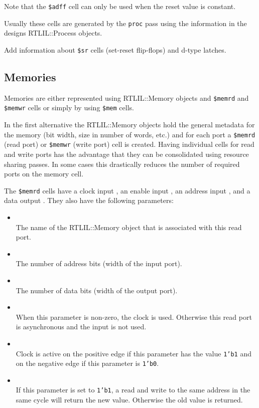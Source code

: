 Note that the {\tt \$adff} cell can only be used when the reset value is constant.

\begin{sloppypar}
Usually these cells are generated by the {\tt proc} pass using the information
in the designs RTLIL::Process objects.
\end{sloppypar}

\begin{fixme}
Add information about {\tt \$sr} cells (set-reset flip-flops) and d-type latches.
\end{fixme}

\subsection{Memories}
\label{sec:memcells}

Memories are either represented using RTLIL::Memory objects and {\tt \$memrd} and {\tt \$memwr} cells
or simply by using {\tt \$mem} cells.

In the first alternative the RTLIL::Memory objects hold the general metadata for the memory (bit width,
size in number of words, etc.) and for each port a {\tt \$memrd} (read port) or {\tt \$memwr} (write port)
cell is created. Having individual cells for read and write ports has the advantage that they can be
consolidated using resource sharing passes. In some cases this drastically reduces the number of required
ports on the memory cell.

The {\tt \$memrd} cells have a clock input , an enable input , an
address input , and a data output . They also have the
following parameters:

\begin{itemize}
\item {} \\
The name of the RTLIL::Memory object that is associated with this read port.

\item {} \\
The number of address bits (width of the  input port).

\item {} \\
The number of data bits (width of the  output port).

\item {} \\
When this parameter is non-zero, the clock is used. Otherwise this read port is asynchronous and
the  input is not used.

\item {} \\
Clock is active on the positive edge if this parameter has the value {\tt 1'b1} and on the negative
edge if this parameter is {\tt 1'b0}.

\item {} \\
If this parameter is set to {\tt 1'b1}, a read and write to the same address in the same cycle will
return the new value. Otherwise the old value is returned.
\end{itemize}

